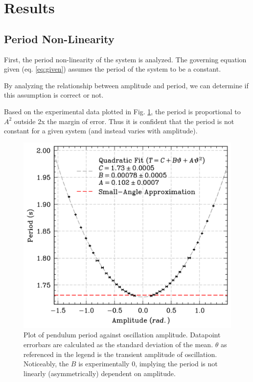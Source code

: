 \documentclass[prl,twocolumn,amsmath,amssymb,superscriptaddress]{revtex4-2}
\begin{document}
\section{Results}


\subsection{Period Non-Linearity}

First, the period non-linearity of the system is analyzed. The governing equation given (eq. \ref{eq:given}) assumes the period of the system to be a constant.

By analyzing the relationship between amplitude and period, we can determine if this assumption is correct or not.

Based on the experimental data plotted in Fig. \ref{fig:amplitude-period}, the period is proportional to $A^2$ outside 2x the margin of error. Thus it is confident that the period is not constant for a given system (and instead varies with amplitude).


\begin{figure}[htb]
    \hspace{-20pt}
    \includegraphics[width=0.85\linewidth]{amp_per_error_of_mean.png}
    \caption{Plot of pendulum period against oscillation amplitude. Datapoint errorbars are calculated as the standard deviation of the mean. $\theta$ as referenced in the legend is the transient amplitude of oscillation. Noticeably, the $B$ is experimentally 0, implying the period is not linearly (asymmetrically) dependent on amplitude.}
    \label{fig:amplitude-period}
\end{figure}
\end{document}
